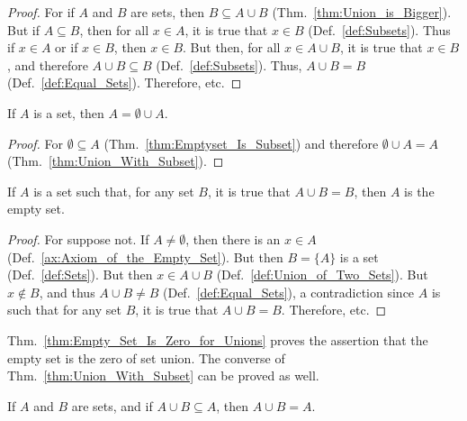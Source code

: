         \begin{proof}
            For if $A$ and $B$ are sets, then
            $B\subseteq{A}\cup{B}$
            (Thm.~\ref{thm:Union_is_Bigger}).
            But if $A\subseteq{B}$, then for all $x\in{A}$,
            it is true that $x\in{B}$
            (Def.~\ref{def:Subsets}). Thus if $x\in{A}$ or if
            $x\in{B}$, then $x\in{B}$. But then, for all
            $x\in{A}\cup{B}$, it is true that $x\in{B}$, and
            therefore $A\cup{B}\subseteq{B}$
            (Def.~\ref{def:Subsets}). Thus,
            $A\cup{B}=B$ (Def.~\ref{def:Equal_Sets}).
            Therefore, etc.
        \end{proof}
        \begin{theorem}
            \label{thm:Union_with_Emptyset}%
            If $A$ is a set, then $A=\emptyset\cup{A}$.
        \end{theorem}
        \begin{proof}
            For $\emptyset\subseteq{A}$
            (Thm.~\ref{thm:Emptyset_Is_Subset}) and
            therefore $\emptyset\cup{A}=A$
            (Thm.~\ref{thm:Union_With_Subset}).
        \end{proof}
        \begin{theorem}
            \label{thm:Empty_Set_Is_Zero_for_Unions}%
            If $A$ is a set such that, for any set $B$, it is
            true that $A\cup{B}=B$, then $A$ is the
            empty set.
        \end{theorem}
        \begin{proof}
            For suppose not. If $A\ne\emptyset$, then there
            is an $x\in{A}$ (Def.~\ref{ax:Axiom_of_the_Empty_Set}).
            But then $B=\{A\}$ is a set
            (Def.~\ref{def:Sets}). But then $x\in{A}\cup{B}$
            (Def.~\ref{def:Union_of_Two_Sets}). But $x\notin{B}$,
            and thus $A\cup{B}\ne{B}$
            (Def.~\ref{def:Equal_Sets}), a contradiction
            since $A$ is such that for any set $B$, it is
            true that $A\cup{B}=B$. Therefore, etc.
        \end{proof}
        Thm.~\ref{thm:Empty_Set_Is_Zero_for_Unions} proves
        the assertion that the empty set is the zero of set
        union. The converse of
        Thm.~\ref{thm:Union_With_Subset} can be proved as
        well.
        \begin{theorem}
            \label{thm:Conv_Union_Is_Bigger}%
            If $A$ and $B$ are sets, and if
            $A\cup{B}\subseteq{A}$, then $A\cup{B}=A$.
        \end{theorem}
